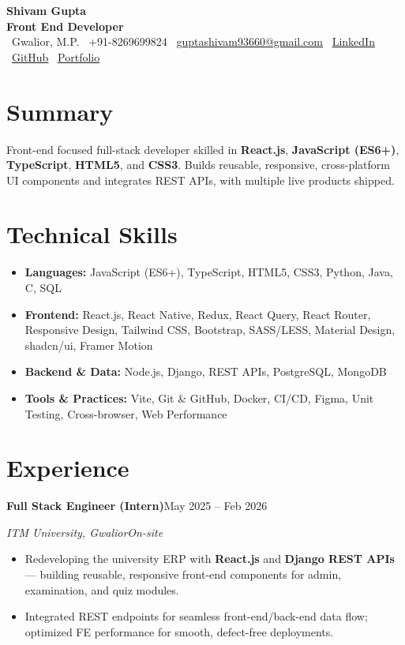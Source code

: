 \documentclass[a4paper,10pt]{article}
\newcommand{\entry}[4]{%
  \vspace{3pt}%
  \textbf{#1}\hfill #2\par
  \vspace{1pt}%
  \textit{#3}\hfill \textit{#4}\par
  \vspace{2pt}%
}
\begin{document}
\begin{center}
  {\Huge \textbf{Shivam Gupta}}\\[4pt]
  {\color{accent}\textbf{Front End Developer}}\\[5pt]
  {\small
  \faMapMarker~Gwalior, M.P. \quad
  \faPhone~+91-8269699824 \quad
  \faEnvelope~\href{mailto:guptashivam93660@gmail.com}{guptashivam93660@gmail.com} \quad
  \faLinkedin~\href{https://www.linkedin.com/in/ur-990q}{LinkedIn} \quad
  \faGithub~\href{https://github.com/Shivam990q}{GitHub} \quad
  \faGlobe~\href{https://shivam-portfolio-a1s4.onrender.com}{Portfolio}}
\end{center}

\section{Summary}
Front-end focused full-stack developer skilled in \textbf{React.js}, \textbf{JavaScript (ES6+)},
\textbf{TypeScript}, \textbf{HTML5}, and \textbf{CSS3}. Builds reusable, responsive, cross-platform
UI components and integrates REST APIs, with multiple live products shipped.

\section{Technical Skills}
\begin{itemize}[label={}, leftmargin=0pt, topsep=2pt, itemsep=2pt]
  \item \textbf{Languages:} JavaScript (ES6+), TypeScript, HTML5, CSS3, Python, Java, C, SQL
  \item \textbf{Frontend:} React.js, React Native, Redux, React Query, React Router, Responsive
        Design, Tailwind CSS, Bootstrap, SASS/LESS, Material Design, shadcn/ui, Framer Motion
  \item \textbf{Backend \& Data:} Node.js, Django, REST APIs, PostgreSQL, MongoDB
  \item \textbf{Tools \& Practices:} Vite, Git \& GitHub, Docker, CI/CD, Figma, Unit Testing,
        Cross-browser, Web Performance
\end{itemize}

\section{Experience}
\entry{Full Stack Engineer (Intern)}{May 2025 -- Feb 2026}{ITM University, Gwalior}{On-site}
\begin{itemize}
  \item Redeveloping the university ERP with \textbf{React.js} and \textbf{Django REST APIs} ---
        building reusable, responsive front-end components for admin, examination, and quiz modules.
  \item Integrated REST endpoints for seamless front-end/back-end data flow; optimized FE
        performance for smooth, defect-free deployments.
\end{itemize}
\end{document}
